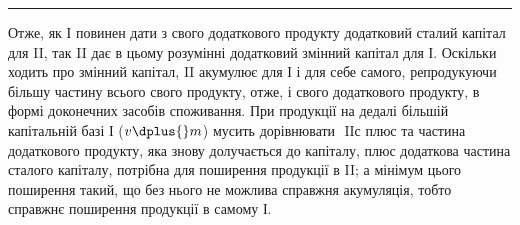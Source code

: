 \pfbreak

Отже, як І повинен дати з свого додаткового продукту додатковий
сталий капітал для II, так II дає в цьому розумінні додатковий змінний
капітал для І. Оскільки ходить про змінний капітал, II акумулює для І і
для себе самого, репродукуючи більшу частину всього свого продукту,
отже, і свого додаткового продукту, в формі доконечних засобів споживання.
При продукції на дедалі більшій капітальній базі І ($v \dplus{} m$) мусить
дорівнювати $\text{ II} с$ плюс та частина додаткового продукту, яка знову долучається
до капіталу, плюс додаткова частина сталого капіталу, потрібна
для поширення продукції в II; а мінімум цього поширення такий, що
без нього не можлива справжня акумуляція, тобто справжнє поширення
продукції в самому І.
